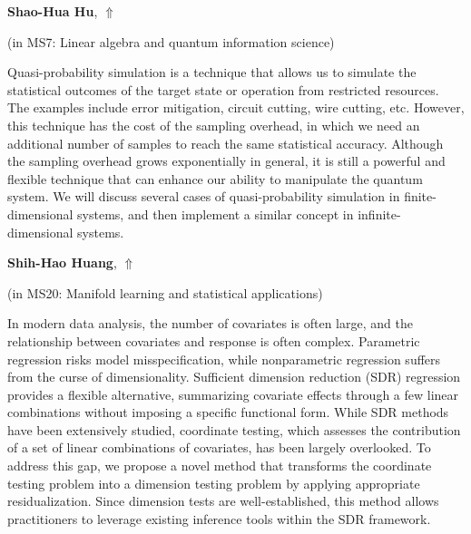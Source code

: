 \documentclass[ILAS2025-program.tex]{subfiles}
\begin{document}
\hypertarget{down0208}{}\begin{ilasabstract}
    
\textbf{Shao-Hua Hu},  \hfill \hyperlink{up0208}{$\Uparrow$}
    
    
(in {\color{mstitle}MS7: Linear algebra and quantum information science})
        
\mtskip
    Quasi-probability simulation is a technique that allows us to simulate the statistical outcomes of the target state or operation from restricted resources.
The examples include error mitigation, circuit cutting, wire cutting, etc.
However, this technique has the cost of the sampling overhead, in which we need an additional number of samples to reach the same statistical accuracy.
Although the sampling overhead grows exponentially in general, it is still a powerful and flexible technique that can enhance our ability to manipulate the quantum system.
We will discuss several cases of quasi-probability simulation in finite-dimensional systems, and then implement a similar concept in infinite-dimensional systems.
\end{ilasabstract}
    

\hypertarget{down0040}{}\begin{ilasabstract}
    
\textbf{Shih-Hao Huang},  \hfill \hyperlink{up0040}{$\Uparrow$}
    
    
(in {\color{mstitle}MS20: Manifold learning and statistical applications})
        
\mtskip
    In modern data analysis, the number of covariates is often large, and the relationship between covariates and response is often complex. Parametric regression risks model misspecification, while nonparametric regression suffers from the curse of dimensionality. Sufficient dimension reduction (SDR) regression provides a flexible alternative, summarizing covariate effects through a few linear combinations without imposing a specific functional form. While SDR methods have been extensively studied, coordinate testing, which assesses the contribution of a set of linear combinations of covariates, has been largely overlooked. To address this gap, we propose a novel method that transforms the coordinate testing problem into a dimension testing problem by applying appropriate residualization. Since dimension tests are well-established, this method allows practitioners to leverage existing inference tools within the SDR framework.

\end{ilasabstract}
    
\end{document}
